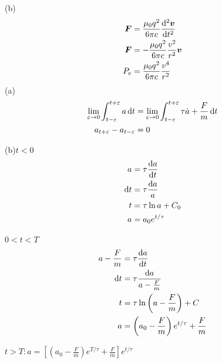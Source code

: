 (b)\begin{align*}
    \boldsymbol F&=\frac{\mu_0q^2}{6\pi c}\frac{\dif^2\boldsymbol{v}}{\dif t^2}\\
    \boldsymbol F&=-\frac{\mu_0q^2}{6\pi c}\frac{v^2}{r^2}\boldsymbol{v}\\
    P_e&=\frac{\mu_0q^2}{6\pi c}\frac{v^4}{r^2}
\end{align*}
(a)
\begin{align*}
    \lim_{\varepsilon\to 0}\int_{t-\varepsilon}^{t+\varepsilon}a\dif t&=\lim_{\varepsilon\to 0}\int_{t-\varepsilon}^{t+\varepsilon}\tau\dot{a}+\frac{F}{m}\dif t\\
    a_{t+\varepsilon}-a_{t-\varepsilon}&=0
\end{align*}

(b)$t<0$\begin{align*}
    a&=\tau\frac{\dif a}{\dif t}\\
    \dif t&=\tau\frac{\dif a}{a}\\
    t&=\tau\ln a+C_0\\
    a&=a_0e^{t/\tau}
\end{align*}

$0<t<T$\begin{align*}
    a-\frac{F}{m}&=\tau\frac{\dif a}{\dif t}\\
    \dif t&=\tau\frac{\dif a}{a-\frac{F}{m}}\\
    t&=\tau\ln \left(a-\frac{F}{m}\right)+C\\
    a&=\left(a_0-\frac{F}{m}\right)e^{t/\tau}+\frac{F}{m}
\end{align*}

$t>T:a=\left[\left(a_0-\frac{F}{m}\right)e^{T/\tau}+\frac{F}{m}\right]e^{t/\tau}$